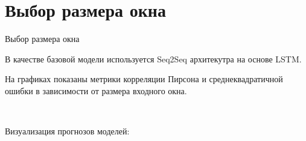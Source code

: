 \documentclass[10pt,pdf,hyperref={unicode}]{beamer}
\begin{document}
\section{Выбор размера окна}
\begin{frame}{Выбор размера окна}

В качестве базовой модели используется Seq2Seq архитекутра на основе LSTM.

На графиках показаны метрики корреляции Пирсона и среднеквадратичной ошибки в зависимости от размера входного окна.

\begin{figure}[h!t]\center
{}
\\
\end{figure}

Визуализация прогнозов моделей:
\begin{figure}[h!t]\center
{}
\\
\end{figure}

\end{frame}
\end{document}
